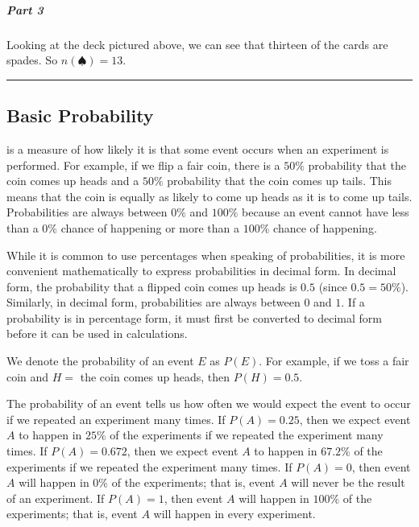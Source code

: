 \documentclass[letterpaper,10pt,english]{jupyterBook}
\begin{document}
\subparagraph{Part 3}
\label{\detokenize{Ch3 Probability/3.1 Introduction to Probability:part-3}}
\sphinxAtStartPar
Looking at the deck pictured above, we can see that thirteen of the cards are spades. So \(n(♠) = 13\).


\bigskip\hrule\bigskip



\subsection{Basic Probability}
\label{\detokenize{Ch3 Probability/3.1 Introduction to Probability:basic-probability}}
\sphinxAtStartPar
{} is a measure of how likely it is that some event occurs when an experiment is performed. For example, if we flip a fair coin, there is a \(50\%\) probability that the coin comes up heads and a \(50\%\) probability that the coin comes up tails. This means that the coin is equally as likely to come up heads as it is to come up tails. Probabilities are always between \(0\%\) and \(100\%\) because an event cannot have less than a \(0\%\) chance of happening or more than a \(100\%\) chance of happening.

\sphinxAtStartPar
While it is common to use percentages when speaking of probabilities, it is more convenient mathematically to express probabilities in decimal form. In decimal form, the probability that a flipped coin comes up heads is \(0.5\) (since \(0.5 = 50\%\)). Similarly, in decimal form, probabilities are always between \(0\) and \(1\). If a probability is in percentage form, it must first be converted to decimal form before it can be used in calculations.

\sphinxAtStartPar
We denote the probability of an event \(E\) as \(P(E)\). For example, if we toss a fair coin and \(H = \) the coin comes up heads, then \(P(H) = 0.5\).

\sphinxAtStartPar
The probability of an event tells us how often we would expect the event to occur if we repeated an experiment many times. If \(P(A) = 0.25\), then we expect event \(A\) to happen in \(25\%\) of the experiments if we repeated the experiment many times. If \(P(A) = 0.672\), then we expect event \(A\) to happen in \(67.2\%\) of the experiments if we repeated the experiment many times. If \(P(A) = 0\), then event \(A\) will happen in \(0\%\) of the experiments; that is, event \(A\) will never be the result of an experiment. If \(P(A) = 1\), then event \(A\) will happen in \(100\%\) of the experiments; that is, event \(A\) will happen in every experiment.
\end{document}
